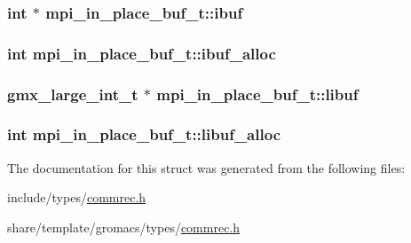 \hypertarget{structmpi__in__place__buf__t_af58e25f67884dc799ce91cf2cd153a99}{
\subsubsection[{ibuf}]{\setlength{\rightskip}{0pt plus 5cm}int $\ast$ {\bf mpi\-\_\-in\-\_\-place\-\_\-buf\-\_\-t\-::ibuf}}}\label{structmpi__in__place__buf__t_af58e25f67884dc799ce91cf2cd153a99}
\hypertarget{structmpi__in__place__buf__t_a9b4962ca65818eee97e3ca3473b0805c}{
\subsubsection[{ibuf\-\_\-alloc}]{\setlength{\rightskip}{0pt plus 5cm}int {\bf mpi\-\_\-in\-\_\-place\-\_\-buf\-\_\-t\-::ibuf\-\_\-alloc}}}\label{structmpi__in__place__buf__t_a9b4962ca65818eee97e3ca3473b0805c}
\hypertarget{structmpi__in__place__buf__t_a04034fcc007503b1952c7f4f897e83cc}{
\subsubsection[{libuf}]{\setlength{\rightskip}{0pt plus 5cm}gmx\-\_\-large\-\_\-int\-\_\-t $\ast$ {\bf mpi\-\_\-in\-\_\-place\-\_\-buf\-\_\-t\-::libuf}}}\label{structmpi__in__place__buf__t_a04034fcc007503b1952c7f4f897e83cc}
\hypertarget{structmpi__in__place__buf__t_aa171d24a7243f97a891cb12324ead377}{
\subsubsection[{libuf\-\_\-alloc}]{\setlength{\rightskip}{0pt plus 5cm}int {\bf mpi\-\_\-in\-\_\-place\-\_\-buf\-\_\-t\-::libuf\-\_\-alloc}}}\label{structmpi__in__place__buf__t_aa171d24a7243f97a891cb12324ead377}


\-The documentation for this struct was generated from the following files\-:\begin{DoxyCompactItemize}
\item 
include/types/\hyperlink{include_2types_2commrec_8h}{commrec.\-h}\item 
share/template/gromacs/types/\hyperlink{share_2template_2gromacs_2types_2commrec_8h}{commrec.\-h}\end{DoxyCompactItemize}
